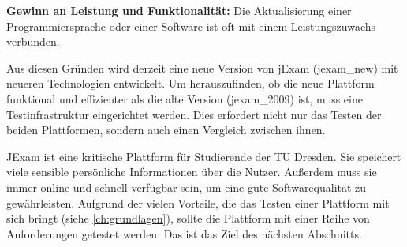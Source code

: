 \textbf{Gewinn an Leistung und Funktionalität:} Die Aktualisierung einer
Programmiersprache oder einer Software ist oft mit einem
Leistungszuwachs verbunden.

Aus diesen Gründen wird derzeit eine neue Version von jExam (\Gls{jexam_new})
mit neueren Technologien entwickelt. Um herauszufinden, ob die neue
Plattform funktional und effizienter als die alte Version (\gls{jexam_2009})
ist, muss eine Testinfrastruktur eingerichtet werden. Dies erfordert
nicht nur das Testen der beiden Plattformen, sondern auch einen Vergleich
zwischen ihnen.


JExam ist eine kritische Plattform für Studierende der TU Dresden.
Sie speichert viele sensible persönliche Informationen über die
Nutzer. Außerdem muss sie immer online und schnell verfügbar sein,
um eine gute Softwarequalität zu gewährleisten. Aufgrund der vielen
Vorteile, die das Testen einer Plattform mit sich bringt
(siehe \autoref{ch:grundlagen}), sollte die Plattform mit einer Reihe von
Anforderungen getestet werden. Das ist das Ziel des nächsten Abschnitts.